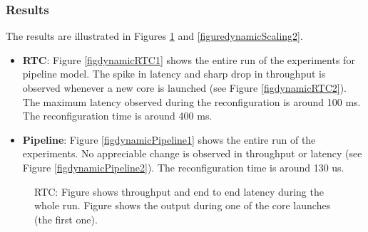 \subsubsection{Results}
The results are illustrated in Figures \ref{figuredynamicScaling1} and \ref{figuredynamicScaling2}.
\begin{itemize}
    \item \textbf{RTC}: Figure \ref{figdynamicRTC1} shows the entire run of the experiments for pipeline model. The spike in latency  and sharp drop in throughput is observed whenever a new core is launched (see Figure \ref{figdynamicRTC2}). The maximum latency observed during the reconfiguration is around 100 ms. The reconfiguration time is around 400 ms. 
    \item \textbf{Pipeline}: Figure \ref{figdynamicPipeline1} shows the entire run of the experiments.  No appreciable change  is observed in throughput  or latency (see Figure \ref{figdynamicPipeline2}). The reconfiguration time is around 130 us. 
\end{itemize}
\begin{figure}[htbp]
    \centering
    \caption{RTC: Figure   shows throughput and end to end latency during the whole run. Figure  shows the output during one of the core launches (the first one). }
    \label{figuredynamicScaling1}
\end{figure}
